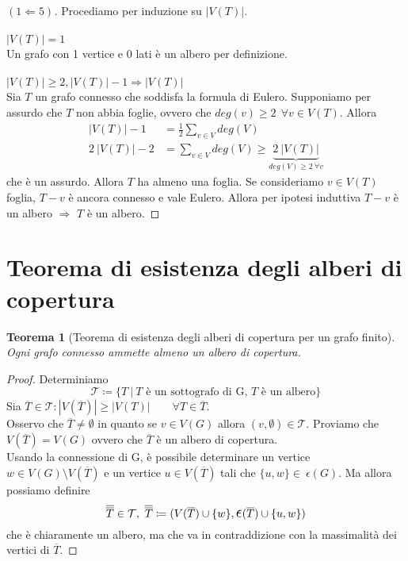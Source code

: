 \documentclass[12pt,twoscolu]{article}
\newcommand{\implica}{\Longrightarrow}
\renewcommand\qedsymbol{$\blacksquare$}
\newcommand{\Eps}{${\Large$\epsilon$}$}
\newcommand{\baseinduzalbero}[1]{\\\\{\boldmath$ |V(T)| = #1$}}
\newcommand{\induzalbero}[1]{\\\\{\boldmath$|V(T)| \ge #1, |V(T)| -1 \implica |V(T)|$}}
\newtheorem{theorem}{Teorema}
\begin{document}
\renewcommand\qedsymbol{$\blacksquare$}
\begin{proof}[$(1 \Longleftarrow 5)$]
Procediamo per induzione su $|V(T)|$.
\baseinduzalbero{1}
\\ Un grafo con 1 vertice e 0 lati è un albero per definizione.
\induzalbero{2}\nopagebreak
\\ Sia $T$ un grafo connesso che soddisfa la formula di Eulero. Supponiamo per assurdo che $T$ non abbia foglie, ovvero che $deg(v) \ge 2 \ \ \forall v \in V(T)$. Allora
\begin{align*}
|V(T)| - 1 &= \frac{1}{2} \sum_{v \in V} deg(V) \\ 
2\ |V(T) | -2 &= \sum_{v \in V} deg(V) \ge \underbrace{2 \ |V(T)|}_{deg(V) \ge 2 \ \forall v}
\end{align*}
che è un assurdo. Allora $T$ ha almeno una foglia. Se consideriamo $v \in V(T)$ foglia, $T-v$ è ancora connesso e vale Eulero. Allora per ipotesi induttiva $T - v$ è un albero $\implica$ $T$ è un albero.
\end{proof}

\section{Teorema di esistenza degli alberi di copertura}
\begin{theorem}[Teorema di esistenza degli alberi di copertura per un grafo finito]
Ogni grafo connesso ammette almeno un albero di copertura.
\end{theorem}

\begin{proof}
Determiniamo
$$ \mathcal{T} \coloneqq \{ T \ | \ \text{$T$ è un sottografo di G, $T$ è un albero} \}$$
Sia $\overline{T} \in \mathcal{T} : |V(\overline{T}) | \ge |V(T)| \qquad \forall T \in \overline{T}$.
\\Osservo che $\overline{T} \ne \emptyset$ in quanto se $v \in V(G)$ allora $(v, \emptyset) \in \mathcal{T}$. Proviamo che $V(\overline{T}) = V(G)$ ovvero che $\overline{T}$ è un albero di copertura.\\
Usando la connessione di G, è possibile determinare un vertice $w \in V(G) \setminus V(\overline{T})$ e un vertice $u \in V(\overline{T})$ tali che $\{u, w\} \in\  \Eps(G)$. Ma allora possiamo definire
$$ \overline{\overline{T}} \in \mathcal{T},\ \overline{\overline{T}} \coloneqq(V(\overline{T}) \cup \{w\}, \mathlarger{\mathlarger{\epsilon}}(\overline{T}) \cup \{u, w\})$$
che è chiaramente un albero, ma che va in contraddizione con la massimalità dei vertici di $\overline{T}$.
\end{proof} 
\end{document}
